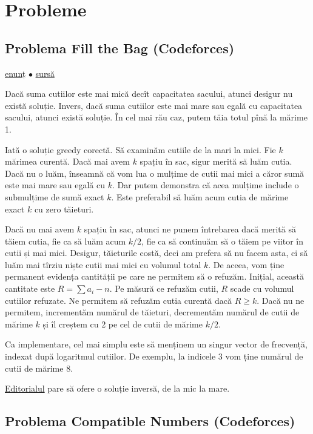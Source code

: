 \documentclass[../main.tex]{subfiles}
\begin{document}
\section{Probleme}

\subsection{Problema Fill the Bag (Codeforces)}
\label{problem:fill-the-bag}

\href{https://codeforces.com/contest/1303/problem/D}{enunț}
$\bullet$
\hyperref[code:fill-the-bag]{sursă}

Dacă suma cutiilor este mai mică decît capacitatea sacului, atunci desigur nu există soluție. Invers, dacă suma cutiilor este mai mare sau egală cu capacitatea sacului, atunci există soluție. În cel mai rău caz, putem tăia totul pînă la mărime 1.

Iată o soluție greedy corectă. Să examinăm cutiile de la mari la mici. Fie $k$ mărimea curentă. Dacă mai avem $k$ spațiu în sac, sigur merită să luăm cutia. Dacă nu o luăm, înseamnă că vom lua o mulțime de cutii mai mici a căror sumă este mai mare sau egală cu $k$. Dar putem demonstra că acea mulțime include o submulțime de sumă exact $k$. Este preferabil să luăm acum cutia de mărime exact $k$ cu zero tăieturi.

Dacă nu mai avem $k$ spațiu în sac, atunci ne punem întrebarea dacă merită să tăiem cutia, fie ca să luăm acum $k/2$, fie ca să continuăm să o tăiem pe viitor în cutii și mai mici. Desigur, tăieturile costă, deci am prefera să nu facem asta, ci să luăm mai tîrziu niște cutii mai mici cu volumul total $k$. De aceea, vom ține permanent evidența cantității pe care ne permitem să o refuzăm. Inițial, această cantitate este $R = \sum a_i - n$. Pe măsură ce refuzăm cutii, $R$ scade cu volumul cutiilor refuzate. Ne permitem să refuzăm cutia curentă dacă $R \geq k$. Dacă nu ne permitem, incrementăm numărul de tăieturi, decrementăm numărul de cutii de mărime $k$ și îl creștem cu 2 pe cel de cutii de mărime $k/2$.

Ca implementare, cel mai simplu este să menținem un singur vector de frecvență, indexat după logaritmul cutiilor. De exemplu, la indicele 3 vom ține numărul de cutii de mărime 8.

\href{https://codeforces.com/blog/entry/73872}{Editorialul} pare să ofere o soluție inversă, de la mic la mare.


\subsection{Problema Compatible Numbers (Codeforces)}
\label{problem:compatible-numbers}
\end{document}
